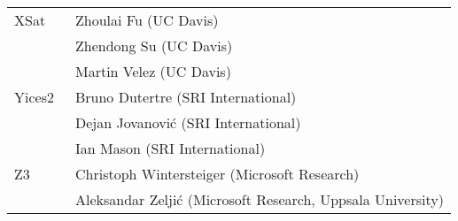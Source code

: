 {\begin{table}
\begin{tabular}{ll}


      XSat~\cite{DBLP:conf/cav/FuS16}
      & Zhoulai Fu (UC Davis) \\
      & Zhendong Su (UC Davis) \\
      & Martin Velez (UC Davis)
      \\ \midrule

      Yices2~\cite{Dutertre:cav2014}
      & Bruno Dutertre (SRI International) \\
      & Dejan Jovanovi\'c (SRI International) \\
      & Ian Mason (SRI International)
      \\ \midrule

      Z3~\cite{DBLP:conf/tacas/MouraB08}
      & Christoph Wintersteiger (Microsoft Research) \\
      & Aleksandar Zelji\'c (Microsoft Research, Uppsala University)
      \\
      \bottomrule
    \end{tabular}
  \end{table}
}

